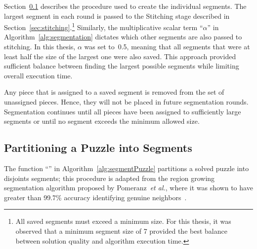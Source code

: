 Section~\ref{sec:segmentPuzzle} describes the procedure used to create the individual segments. The largest segment in each round is passed to the Stitching stage described in Section~\ref{sec:stitching}.\footnote{All saved segments must exceed a minimum size.  For this thesis, it was observed that a minimum segment size of 7 provided the best balance between solution quality and algorithm execution time.} Similarly, the multiplicative scalar term ``\textit{$\alpha$}'' in Algorithm~\ref{alg:segmentation} dictates which other segments are also passed to stitching.  In this thesis, \textit{$\alpha$} was set to~0.5, meaning that all segments that were at least half the size of the largest one were also saved.  This approach provided sufficient balance between finding the largest possible segments while limiting overall execution time.

Any piece that is assigned to a saved segment is removed from the set of unassigned pieces.  Hence, they will not be placed in future segmentation rounds.  Segmentation continues until all pieces have been assigned to sufficiently large segments or until no segment exceeds the minimum allowed size.

\subsection{Partitioning a Puzzle into Segments}\label{sec:segmentPuzzle}

The function ``'' in Algorithm~\ref{alg:segmentPuzzle} partitions a solved puzzle into disjoints segments; this procedure is adapted from the region growing segmentation algorithm proposed by Pomeranz~\textit{et al.}, where it was shown to have greater than 99.7\% accuracy identifying genuine neighbors~\cite{pomeranz2011}. 

